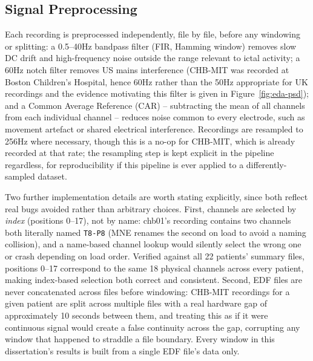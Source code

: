\subsection{Signal Preprocessing}

Each recording is preprocessed independently, file by file, before any windowing or splitting: a 0.5--40Hz bandpass filter (FIR, Hamming window) removes slow DC drift and high-frequency 
noise outside the range relevant to ictal activity; a 60Hz notch filter removes US mains interference (CHB-MIT was recorded at Boston Children's Hospital, hence 60Hz rather than the 
50Hz appropriate for UK recordings and the evidence motivating this filter is given in Figure~\ref{fig:eda-psd}); and a Common Average Reference (CAR) -- subtracting the 
mean of all channels from each individual channel -- reduces noise common to every electrode, such as movement artefact or shared electrical interference. Recordings are resampled to 
256Hz where necessary, though this is a no-op for CHB-MIT, which is already recorded at that rate; the resampling step is kept explicit in the pipeline regardless, for reproducibility 
if this pipeline is ever applied to a differently-sampled dataset.


Two further implementation details are worth stating explicitly, since both reflect real bugs avoided rather than arbitrary choices. First, channels are selected by \emph{index} (positions 0--17), not by name: chb01's recording contains two channels both literally named \texttt{T8-P8} (MNE renames the second on load to avoid a naming collision), and a name-based channel lookup would silently select the wrong one or crash depending on load order. Verified against all 22 patients' summary files, positions 0--17 correspond to the same 18 physical channels across every patient, making index-based selection both correct and consistent. Second, EDF files are never concatenated across files before windowing: CHB-MIT recordings for a given patient are split across multiple files with a real hardware gap of approximately 10 seconds between them, and treating this as if it were continuous signal would create a false continuity across the gap, corrupting any window that happened to straddle a file boundary. Every window in this dissertation's results is built from a single EDF file's data only.

